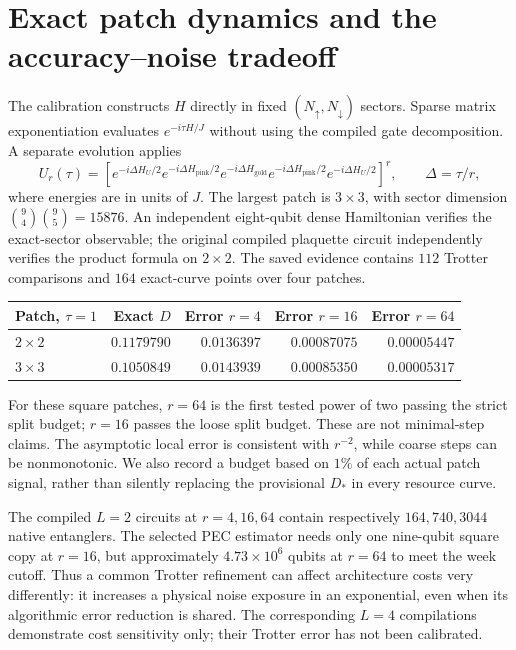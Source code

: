 \documentclass[11pt]{article}
\begin{document}
\section{Exact patch dynamics and the accuracy--noise tradeoff}
The calibration constructs $H$ directly in fixed $(N_\uparrow,N_\downarrow)$
sectors. Sparse matrix exponentiation evaluates $e^{-i\tau H/J}$ without using
the compiled gate decomposition. A separate evolution applies
\begin{equation}
 U_r(\tau)=\left[
 e^{-i\Delta H_U/2}
 e^{-i\Delta H_{\mathrm{pink}}/2}
 e^{-i\Delta H_{\mathrm{gold}}}
 e^{-i\Delta H_{\mathrm{pink}}/2}
 e^{-i\Delta H_U/2}\right]^r,
 \qquad \Delta=\tau/r,
\end{equation}
where energies are in units of $J$. The largest patch is $3\times3$, with
sector dimension $\binom94\binom95=15876$. An independent eight-qubit dense
Hamiltonian verifies the exact-sector observable; the original compiled
plaquette circuit independently verifies the product formula on $2\times2$.
The saved evidence contains $112$ Trotter comparisons and $164$ exact-curve
points over four patches.

\begin{center}
\begin{tabular}{lrrrr}
\toprule
Patch, $\tau=1$ & Exact $D$ & Error $r=4$ & Error $r=16$ & Error $r=64$\\
\midrule
$2\times2$ & $0.1179790$ & $0.0136397$ & $0.00087075$ & $0.00005447$\\
$3\times3$ & $0.1050849$ & $0.0143939$ & $0.00085350$ & $0.00005317$\\
\bottomrule
\end{tabular}
\end{center}
For these square patches, $r=64$ is the first tested power of two passing the
strict split budget; $r=16$ passes the loose split budget. These are not
minimal-step claims. The asymptotic local error is consistent with $r^{-2}$,
while coarse steps can be nonmonotonic. We also record a budget based on $1\%$
of each actual patch signal, rather than silently replacing the provisional
$D_*$ in every resource curve.

The compiled $L=2$ circuits at $r=4,16,64$ contain respectively $164,740,3044$
native entanglers. The selected PEC estimator needs only one nine-qubit square
copy at $r=16$, but approximately $4.73\times10^6$ qubits at $r=64$ to meet
the week cutoff. Thus a common Trotter refinement can affect architecture
costs very differently: it increases a physical noise exposure in an
exponential, even when its algorithmic error reduction is shared. The
corresponding $L=4$ compilations demonstrate cost sensitivity only; their
Trotter error has not been calibrated.
\end{document}
